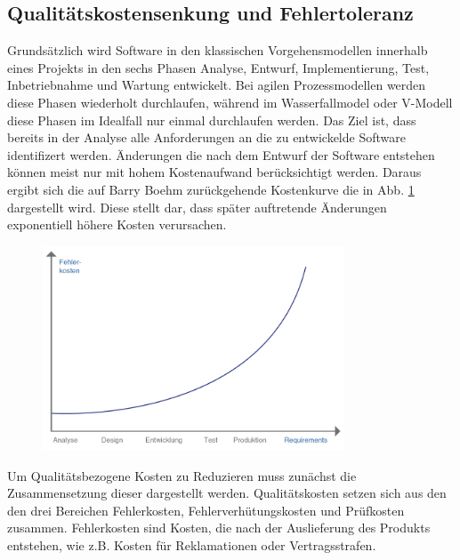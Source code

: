 \subsection{Qualitätskostensenkung und Fehlertoleranz}
Grundsätzlich wird Software in den klassischen Vorgehensmodellen innerhalb eines Projekts in den sechs Phasen Analyse, Entwurf, Implementierung, Test, Inbetriebnahme und Wartung entwickelt.
Bei agilen Prozessmodellen werden diese Phasen wiederholt durchlaufen, während im Wasserfallmodel oder V-Modell diese Phasen im Idealfall nur einmal durchlaufen werden.
Das Ziel ist, dass bereits in der Analyse alle Anforderungen an die zu entwickelde Software identifizert werden.
Änderungen die nach dem Entwurf der Software entstehen können meist nur mit hohem Kostenaufwand berücksichtigt werden.
Daraus ergibt sich die auf Barry Boehm zurückgehende Kostenkurve die in Abb. \ref{fig:boehm} dargestellt wird.
Diese stellt dar, dass später auftretende Änderungen exponentiell höhere Kosten verursachen.
\autocite[vgl.][S. 95]{witte_testmanagement_2019}
\begin{figure}[H]
    \centering
    \includegraphics[width=0.8\textwidth]{images/boehm.png}
    \label{fig:boehm}
\end{figure}\noindent
Um Qualitätsbezogene Kosten zu Reduzieren muss zunächst die Zusammensetzung dieser dargestellt werden.
Qualitätskosten setzen sich aus den den drei Bereichen Fehlerkosten, Fehlerverhütungskosten und Prüfkosten zusammen.
Fehlerkosten sind Kosten, die nach der Auslieferung des Produkts entstehen, wie z.B. Kosten für Reklamationen oder Vertragsstrafen.
